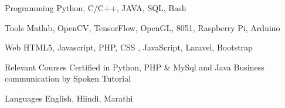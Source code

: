

\begin{cvskills}

  \cvskill
    {Programming} %
    {Python, C/C++, JAVA,  SQL, Bash} %

  \cvskill
    {Tools} %
    {Matlab, OpenCV, TensorFlow, OpenGL, 8051, Raspberry Pi, Arduino} %

  \cvskill
    {Web} %
    { HTML5, Javascript, PHP, CSS , JavaScript, Laravel, Bootstrap} %

  \cvskill
    {Relevant Courses} %
    {Certified in Python, PHP \& MySql and Java Business communication by Spoken Tutorial} %

  \cvskill
    {Languages} %
    {English, Hiindi, Marathi} %

\end{cvskills}

